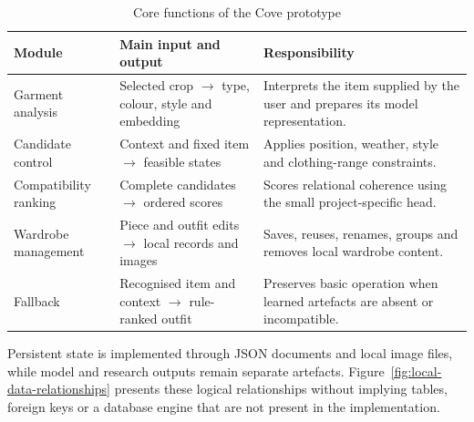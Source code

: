 \begin{table}[htbp]
  \centering
  \caption{Core functions of the Cove prototype}
  \label{tab:application-functions}
  \small
  \begin{tabularx}{\textwidth}{@{}p{}p{}X@{}}
    \toprule
    \textbf{Module} & \textbf{Main input and output} & \textbf{Responsibility} \\
    \midrule
    Garment analysis & Selected crop $\rightarrow$ type, colour, style and embedding & Interprets the item supplied by the user and prepares its model representation. \\
    Candidate control & Context and fixed item $\rightarrow$ feasible states & Applies position, weather, style and clothing-range constraints. \\
    Compatibility ranking & Complete candidates $\rightarrow$ ordered scores & Scores relational coherence using the small project-specific head. \\
    Wardrobe management & Piece and outfit edits $\rightarrow$ local records and images & Saves, reuses, renames, groups and removes local wardrobe content. \\
    Fallback & Recognised item and context $\rightarrow$ rule-ranked outfit & Preserves basic operation when learned artefacts are absent or incompatible. \\
    \bottomrule
  \end{tabularx}
\end{table}

Persistent state is implemented through JSON documents and local image files,
while model and research outputs remain separate artefacts.
Figure~\ref{fig:local-data-relationships} presents these
logical relationships without implying tables, foreign keys or a database
engine that are not present in the implementation.



